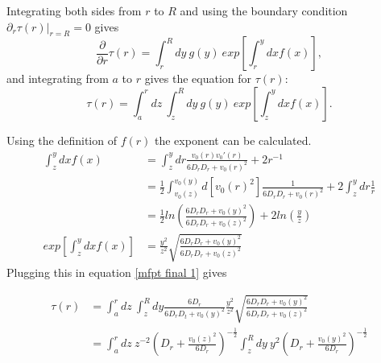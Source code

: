 \documentclass[paper=a4, fontsize=11pt]{scrartcl} %
\begin{document}
Integrating both sides from $r$ to $R$ and using the boundary condition $ \partial_r \tau(r) \bigg\rvert_{r=R} = 0$ gives
\begin{equation}\label{mfpt s2}
\frac{\partial}{\partial r} \tau(r) = \int_r^R dy\ g(y)\ exp\left[ \int_r^y dx f(x) \right],
\end{equation}
and integrating from $a$ to $r$ gives the equation for $\tau(r)$:
\begin{equation}\label{mfpt final 1}
\tau(r) = \int_a^rdz\ \int_z^R dy\ g(y)\ exp\left[ \int_z^y dx f(x) \right].
\end{equation}

Using the definition of $f(r)$ the exponent can be calculated.
\begin{align}\label{exp f}
\int_z^y dx f(x) & = \int_z^y dr \frac{v_0(r)v_0'(r)}{6D_r D_r + v_0(r)^2}  + 2r^{-1} \\
& = \frac{1}{2} \int_{v_0(z)}^{v_0(y)} d\left[v_0(r)^2\right] \frac{1}{6D_r D_r + v_0(r)^2}+ 2 \int_z^y dr \frac{1}{r} \\
& = \frac{1}{2} ln\left( \frac{6D_r D_r + v_0(y)^2}{6D_r D_r + v_0(z)^2} \right) + 2 ln\left( \frac{y}{z} \right) \\
exp\left[ \int_z^y dx f(x) \right] &= \frac{y^2}{z^2} \sqrt{\frac{6D_r D_r + v_0(y)^2}{6D_r D_r + v_0(z)^2}}
\end{align}
Plugging this in equation \ref{mfpt final 1} gives

\begin{align}
\tau(r) & = \int_a^rdz\ \int_z^R dy \frac{6D_r}{6D_r D_t + v_0(y)^2}
\frac{y^2}{z^2} \sqrt{\frac{6D_r D_r + v_0(y)^2}{6D_r D_r + v_0(z)^2}} \\
& = \int_a^rdz\  z^{-2} \left(D_r + \frac{v_0(z)^2}{6D_r} \right)^{-\frac{1}{2}}
\int_z^Rdy\
y^{2} \left(D_r +\frac{v_0(y)^2}{6D_r} \right)^{-\frac{1}{2}}
\end{align}
\end{document}
